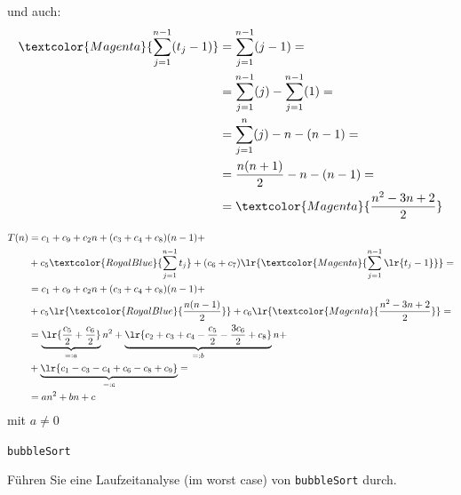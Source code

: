 \begin{frame}
	und auch:
	\begin{align*}
		\textcolor{Magenta}{\sum_{j=1}^{n-1} (t_j - 1)} & = \sum_{j=1}^{n-1} (j - 1) =                    \\
		                                                & = \sum_{j=1}^{n-1} (j) - \sum_{j=1}^{n-1} (1) = \\
		                                                & = \sum_{j=1}^{n} (j) - n - (n-1) =              \\
		                                                & = \frac{n(n+1)}{2} - n - (n-1) =                \\
		                                                & = \textcolor{Magenta}{\frac{n^2 - 3n + 2}{2}}
	\end{align*}
\end{frame}


\begin{frame}[fragile]
	\begin{align*}
		T(n) & = c_1 + c_9 + c_2n + (c_3 + c_4 + c_8)(n-1) +                                                                                                  \\
		     & + c_5\textcolor{RoyalBlue}{\sum_{j=1}^{n-1}t_j} + (c_6 + c_7)\lr{\textcolor{Magenta}{\sum_{j=1}^{n-1}\lr{t_j - 1}}} =                          \\
		     & = c_1 + c_9 + c_2n + (c_3 + c_4 + c_8)(n-1) +                                                                                                  \\
		     & + c_5\lr{\textcolor{RoyalBlue}{\frac{n(n-1)}{2}}} + c_6\lr{\textcolor{Magenta}{\frac{n^2 - 3n + 2}{2}}} =                                      \\
		     & = \underbrace{\lr{\frac{c_5}{2} + \frac{c_6}{2}}}_{=:a}n^2 + \underbrace{\lr{c_2 + c_3 + c_4 - \frac{c_5}{2} - \frac{3c_6}{2} + c_8}}_{=:b}n + \\
		     & + \underbrace{\lr{c_1 - c_3 - c_4 + c_6 - c_8 + c_9}}_{=:c} =                                                                                  \\
		     & = an^2 + bn + c
	\end{align*}
	mit $a\neq 0$
\end{frame}

\begin{frame}{\texttt{bubbleSort}}
	\begin{myexercise}
		Führen Sie eine Laufzeitanalyse (im worst case) von \texttt{bubbleSort} durch.
		
	\end{myexercise}
\end{frame}


